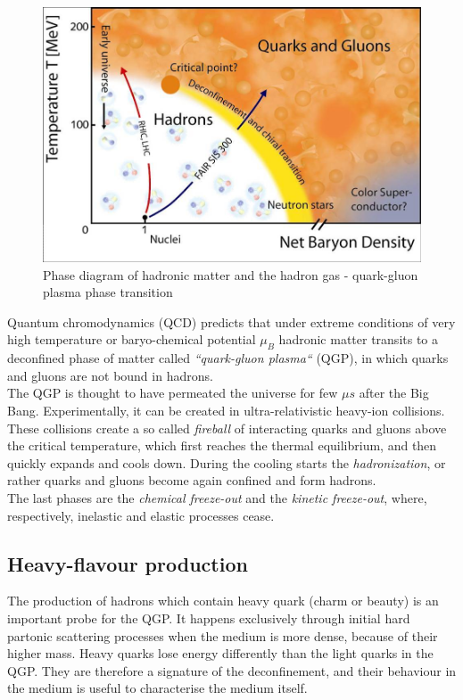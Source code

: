 \documentclass[a4paper,twocolumn,gsifonts,twoside]{gsipaper}
\begin{document}
\begin{figure}[htb]
\begin{center}
\advance\leftskip-1cm
\advance{}
\includegraphics[scale = 0.35]{QCD_phase_diagram.jpg}
\caption{Phase diagram of hadronic matter and the hadron gas - quark-gluon plasma phase transition}
\label{diagram}
\end{center}
\end{figure}

Quantum chromodynamics (QCD) predicts that under extreme conditions of very high temperature
or baryo-chemical potential $\mu_{B}$ hadronic matter transits to a deconfined phase of matter called \textit{``quark-gluon plasma``}
(QGP), in which quarks and gluons are not bound in hadrons.\\

The QGP is thought to have permeated the universe for few $\mu s$ after the Big Bang. Experimentally, it can be created in 
ultra-relativistic heavy-ion collisions.\\
These collisions create a so called \textit{fireball} of interacting quarks and gluons above the critical temperature, 
which first reaches the thermal equilibrium, and then quickly expands and cools down. During the cooling starts the \textit{hadronization}, 
or rather quarks and gluons become again confined and form hadrons.\\
The last phases are the \textit{chemical freeze-out} and the \textit{kinetic freeze-out}, where, 
respectively, inelastic and elastic processes cease.

\subsection{Heavy-flavour production}
The production of hadrons which contain heavy quark (charm or beauty) is an important probe for the QGP. It happens exclusively 
through initial hard partonic scattering processes when the medium is more dense, because of their higher mass. Heavy quarks lose 
energy differently than the light quarks in the QGP. They are therefore a signature of the deconfinement, 
and their behaviour in the medium is useful to characterise the medium itself.\\
\end{document}
